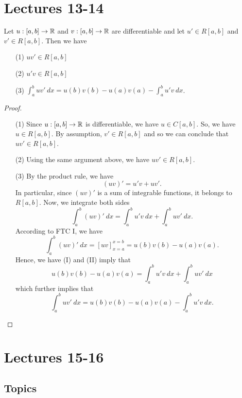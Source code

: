 \documentclass{report}
\begin{document}
\section{Lectures 13-14}

\begin{theorem}
    Let \( u : [a,b] \to \mathbb{R}  \) and \( v : [a,b] \to \mathbb{R}  \) are differentiable and let \( u' \in R[a,b] \) and \( v' \in R[a,b] \). Then we have  
    \begin{enumerate}
        \item[(1)] \( uv' \in R [a,b] \)
        \item[(2)] \( u' v \in R[a,b] \)
        \item[(3)] \( \displaystyle  \int_{ a }^{ b }  uv'  \ dx = u(b)v(b) - u(a) v(a) - \displaystyle \int_{ a }^{ b } u' v  \ dx  \).
    \end{enumerate}
\end{theorem}

\begin{proof}
\begin{enumerate}
    \item[(1)] Since \( u:[a,b] \to \mathbb{R}  \) is differentiable, we have \( u \in C[a,b] \). So, we have \( u \in R[a,b] \). By assumption, \( v' \in R[a,b] \) and so we can conclude that \( uv' \in R[a,b] \).
    \item[(2)] Using the same argument above, we have \( uv' \in R[a,b] \).
    \item[(3)] By the product rule, we have 
        \[  (uv)' = u' v + u v'. \]
        In particular, since \( (uv)' \) is a sum of integrable functions, it belongs to \( R[a,b] \). Now, we integrate both sides 
        \[  \int_{ a }^{ b }  (uv)'   \ dx = \int_{ a }^{ b } u'v \ dx + \int_{ a }^{ b }  uv' \ dx. \tag{I} \]
        According to FTC I, we have
        \[  \int_{ a }^{ b } (uv)'  \ dx = [uv]_{x = a}^{x =b} = u(b)v(b) - u(a)v(a). \tag{II} \]
        Hence, we have (I) and (II) imply that
        \[  u(b)v(b) - u(a)v(a) = \int_{ a }^{ b } u'v \ dx + \int_{ a }^{ b }  u v' \ dx \]
        which further implies that 
        \[  \int_{ a }^{ b } uv' \ dx = u(b)v(b) - u(a)v(a) - \int_{ a }^{ b } u'v \ dx. \]
\end{enumerate}
\end{proof}

\section{Lectures 15-16}

\subsection{Topics}
\end{document}
